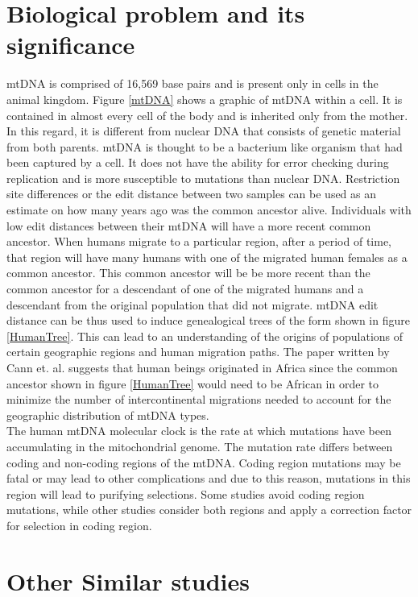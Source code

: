 \documentclass[conference]{IEEEtran}
\begin{document}
\section{Biological problem and its significance}
mtDNA is comprised of 16,569 base pairs and is present only in cells in the animal kingdom. Figure \ref{mtDNA} shows a graphic of mtDNA within a cell. It is contained in almost every cell of the body and is inherited only from the mother. In this regard, it is different from nuclear DNA that consists of genetic material from both parents. mtDNA is thought to be a bacterium like organism that had been captured by a cell. It does not have the ability for error checking during replication and is more susceptible to mutations than nuclear DNA. Restriction site differences or the edit distance between two samples can be used as an estimate on how many years ago was the common ancestor alive. Individuals with low edit distances between their mtDNA will have a more recent common ancestor. When humans migrate to a particular region, after a period of time, that region will have many humans with one of the migrated human females as a common ancestor. This common ancestor will be be more recent than the common ancestor for a descendant of one of the migrated humans and a descendant from the original population that did not migrate. mtDNA edit distance can be thus used to induce genealogical trees of the form shown in figure \ref{HumanTree}. This can lead to an understanding of the origins of populations of certain geographic regions and human migration paths. The paper written by Cann et. al. suggests that human beings originated in Africa since the common ancestor shown in figure \ref{HumanTree} would need to be African in order to minimize the number of intercontinental migrations needed to account for the geographic distribution of mtDNA types.\\

The human mtDNA molecular clock is the rate at which mutations have been accumulating in the mitochondrial genome. The mutation rate differs between coding and non-coding regions of the mtDNA. Coding region mutations may be fatal or may lead to other complications and due to this reason, mutations in this region will lead to purifying selections. Some studies avoid coding region mutations, while other studies consider both regions 
 and apply a correction factor for selection in coding region. 

\FloatBarrier
\section{Other Similar studies}
\end{document}
